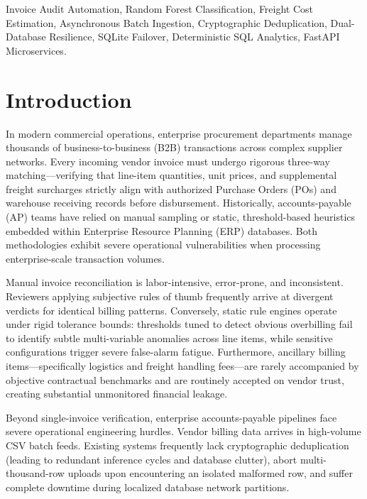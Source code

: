 \documentclass[conference]{IEEEtran}
\begin{document}
\begin{IEEEkeywords}
Invoice Audit Automation, Random Forest Classification, Freight Cost Estimation, Asynchronous Batch Ingestion, Cryptographic Deduplication, Dual-Database Resilience, SQLite Failover, Deterministic SQL Analytics, FastAPI Microservices.
\end{IEEEkeywords}

\section{Introduction}

In modern commercial operations, enterprise procurement departments manage thousands of business-to-business (B2B) transactions across complex supplier networks. Every incoming vendor invoice must undergo rigorous three-way matching---verifying that line-item quantities, unit prices, and supplemental freight surcharges strictly align with authorized Purchase Orders (POs) and warehouse receiving records before disbursement. Historically, accounts-payable (AP) teams have relied on manual sampling or static, threshold-based heuristics embedded within Enterprise Resource Planning (ERP) databases. Both methodologies exhibit severe operational vulnerabilities when processing enterprise-scale transaction volumes.

Manual invoice reconciliation is labor-intensive, error-prone, and inconsistent. Reviewers applying subjective rules of thumb frequently arrive at divergent verdicts for identical billing patterns. Conversely, static rule engines operate under rigid tolerance bounds: thresholds tuned to detect obvious overbilling fail to identify subtle multi-variable anomalies across line items, while sensitive configurations trigger severe false-alarm fatigue. Furthermore, ancillary billing items---specifically logistics and freight handling fees---are rarely accompanied by objective contractual benchmarks and are routinely accepted on vendor trust, creating substantial unmonitored financial leakage.

Beyond single-invoice verification, enterprise accounts-payable pipelines face severe operational engineering hurdles. Vendor billing data arrives in high-volume CSV batch feeds. Existing systems frequently lack cryptographic deduplication (leading to redundant inference cycles and database clutter), abort multi-thousand-row uploads upon encountering an isolated malformed row, and suffer complete downtime during localized database network partitions.
\end{document}
